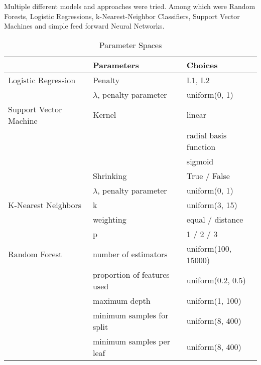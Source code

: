 Multiple different models and approaches were tried. Among which were Random Forests, Logistic Regressions, k-Nearest-Neighbor Classifiers, Support Vector Machines and simple feed forward Neural Networks.


\begin{table}
\centering
\caption{Parameter Spaces}
\label{spaces}
\tiny
\begin{tabular}{lll}
                            & Parameters                  & Choices                                \\ \hline
Logistic Regression         & Penalty                     & L1, L2                                 \\
                            & $\lambda$, penalty parameter       & uniform(0, 1)                          \\
Support Vector Machine      & Kernel                      & linear \\
                            &                             & radial basis function\\
                            &                             &  sigmoid \\
                            & Shrinking                   & True / False                           \\
                            & $\lambda$, penalty parameter                      & uniform(0, 1)                          \\
K-Nearest Neighbors         & k                           & uniform(3, 15)                         \\
                            & weighting                   & equal / distance                       \\
                            & p                           & 1  / 2 / 3                             \\
Random Forest               & number of estimators        & uniform(100, 15000)                    \\
                            & proportion of features used & uniform(0.2, 0.5)                      \\
                            & maximum depth               & uniform(1, 100)                        \\
                            & minimum samples for split   & uniform(8, 400)                        \\
                            & minimum samples per leaf    & uniform(8, 400)                        \\

\end{tabular}
\end{table}
